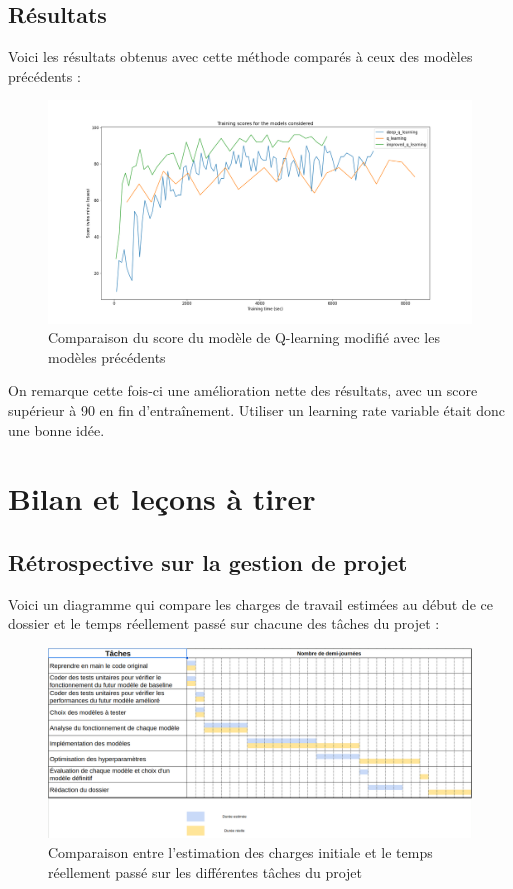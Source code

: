 \documentclass[french]{article}
\begin{document}
    \subsection{Résultats}

    Voici les résultats obtenus avec cette méthode comparés à ceux des modèles précédents :


    \begin{figure}[h]
        \includegraphics[width=12cm]{improved_q_learning_metrics}
        \centering
        \caption{Comparaison du score du modèle de Q-learning modifié avec les modèles précédents}
        \centering
    \end{figure}

    On remarque cette fois-ci une amélioration nette des résultats, avec un score supérieur à 90 en fin d'entraînement. Utiliser un learning rate variable était donc une bonne idée.
    
    \section{Bilan et leçons à tirer}
    \subsection{Rétrospective sur la gestion de projet}

    Voici un diagramme qui compare les charges de travail estimées au début de ce dossier et le temps réellement passé sur chacune des tâches du projet :

    \begin{figure}[h]
        \includegraphics[width=13cm]{gantt_2}
        \centering
        \caption{Comparaison entre l'estimation des charges initiale et le temps réellement passé sur les différentes tâches du projet}
        \centering
    \end{figure}
\end{document}
